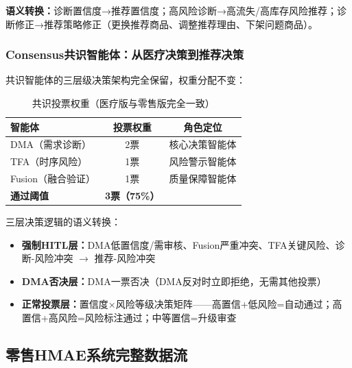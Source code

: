 \documentclass[11pt,a4paper]{ctexart}
\theoremstyle{remark}
\begin{document}
\textbf{语义转换：}诊断置信度→推荐置信度；高风险诊断→高流失/高库存风险推荐；诊断修正→推荐策略修正（更换推荐商品、调整推荐理由、下架问题商品）。

\subsubsection{Consensus共识智能体：从医疗决策到推荐决策}

共识智能体的三层级决策架构完全保留，权重分配不变：

\begin{table}[H]
\centering
\caption{共识投票权重（医疗版与零售版完全一致）}
\begin{tabular}{lcc}
\toprule
\textbf{智能体} & \textbf{投票权重} & \textbf{角色定位} \\
\midrule
DMA（需求诊断） & 2票 & 核心决策智能体 \\
TFA（时序风险） & 1票 & 风险警示智能体 \\
Fusion（融合验证） & 1票 & 质量保障智能体 \\
\midrule
\textbf{通过阈值} & \textbf{3票（75\%）} & \\
\bottomrule
\end{tabular}
\end{table}

三层决策逻辑的语义转换：
\begin{itemize}[nosep]
\item \textbf{强制HITL层：}DMA低置信度/需审核、Fusion严重冲突、TFA关键风险、诊断-风险冲突 $\rightarrow$ 推荐-风险冲突
\item \textbf{DMA否决层：}DMA一票否决（DMA反对时立即拒绝，无需其他投票）
\item \textbf{正常投票层：}置信度×风险等级决策矩阵——高置信+低风险=自动通过；高置信+高风险=风险标注通过；中等置信=升级审查
\end{itemize}

\subsection{零售HMAE系统完整数据流}
\end{document}
